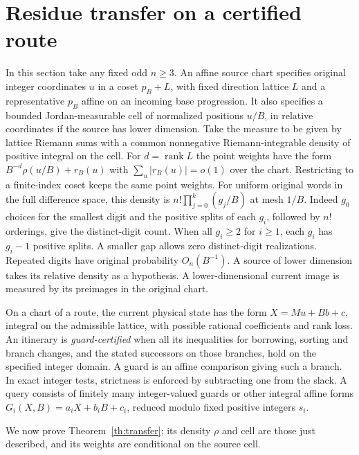 \documentclass[11pt,reqno]{amsart}
\theoremstyle{definition}
\begin{document}
\section{Residue transfer on a certified route}\label{sec:transfer}
In this section take any fixed odd \(n\ge3\). An affine source chart specifies original integer coordinates \(u\) in a coset \(p_B+L\), with fixed direction lattice \(L\) and a representative \(p_B\) affine on an incoming base progression. It also specifies a bounded Jordan-measurable cell of normalized positions \(u/B\), in relative coordinates if the source has lower dimension. Take the measure to be given by lattice Riemann sums with a common nonnegative Riemann-integrable density of positive integral on the cell. For \(d=\operatorname{rank}L\) the point weights have the form \(B^{-d}\rho(u/B)+r_B(u)\) with \(\sum_u|r_B(u)|=o(1)\) over the chart. Restricting to a finite-index coset keeps the same point weights. For uniform original words in the full difference space, this density is \(n!\prod_{j=0}^k(g_j/B)\) at mesh \(1/B\). Indeed \(g_0\) choices for the smallest digit and the positive splits of each \(g_i\), followed by \(n!\) orderings, give the distinct-digit count. When all \(g_i\ge2\) for \(i\ge1\), each \(g_i\) has \(g_i-1\) positive splits. A smaller gap allows zero distinct-digit realizations. Repeated digits have original probability \(O_n(B^{-1})\). A source of lower dimension takes its relative density as a hypothesis. A lower-dimensional current image is measured by its preimages in the original chart.

On a chart of a route, the current physical state has the form \(X=Mu+B b+c\), integral on the admissible lattice, with possible rational coefficients and rank loss. An itinerary is \emph{guard-certified} when all its inequalities for borrowing, sorting and branch changes, and the stated successors on those branches, hold on the specified integer domain. A guard is an affine comparison giving such a branch. In exact integer tests, strictness is enforced by subtracting one from the slack. A query consists of finitely many integer-valued guards or other integral affine forms \(G_i(X,B)=a_iX+b_iB+c_i\), reduced modulo fixed positive integers \(s_i\).

We now prove Theorem~\ref{th:transfer}; its density \(\rho\) and cell are those just described, and its weights are conditional on the source cell.
\end{document}
